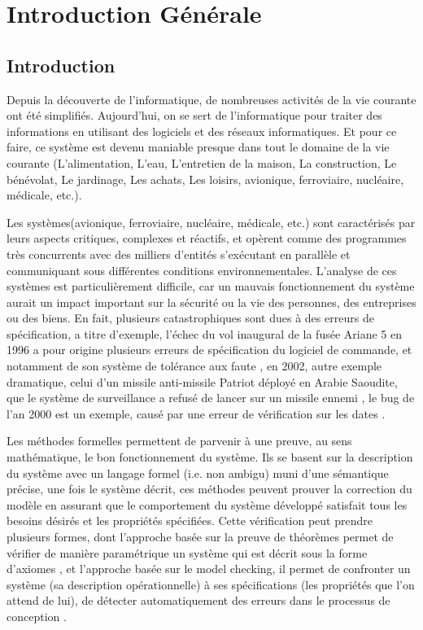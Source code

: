\chapter{Introduction Générale}
\section{Introduction}
Depuis la découverte de l’informatique, de nombreuses activités de la vie courante ont été simplifiés. Aujourd’hui, on se sert de l’informatique pour traiter des informations en utilisant des logiciels et des réseaux informatiques. Et pour ce faire, ce système est devenu maniable presque dans tout le domaine de la vie courante (L'alimentation, L'eau, L’entretien de la maison, La construction, Le bénévolat, Le jardinage, Les achats, Les loisirs, avionique, ferroviaire, nucléaire, médicale, etc.).

Les systèmes(avionique, ferroviaire, nucléaire, médicale, etc.) sont caractérisés par leurs aspects critiques, complexes et réactifs, et opèrent comme des programmes très concurrents avec des milliers d’entités s’exécutant en parallèle et communiquant sous différentes conditions environnementales. L’analyse de ces systèmes est particulièrement difficile, car un mauvais fonctionnement du système aurait un impact important sur la sécurité ou la vie des personnes, des entreprises ou des biens. En fait, plusieurs catastrophiques sont dues à des erreurs de spécification, a titre d'exemple, l'échec du vol inaugural de la fusée Ariane 5 en 1996 a pour origine  plusieurs erreurs de spécification du logiciel de commande, et notamment de son système de tolérance aux faute \cite{arian5}, en 2002, autre exemple dramatique, celui d’un missile anti-missile Patriot déployé en Arabie Saoudite, que le système de surveillance a refusé de lancer sur un missile ennemi \cite{patriot}, le bug de l'an 2000 est un exemple, causé par une erreur de vérification sur les dates \cite{bug2000}.

Les méthodes formelles permettent de parvenir à une preuve, au sens mathématique, le bon fonctionnement du système. Ils
se basent sur la description du système avec un langage formel (i.e. non ambigu) muni d’une sémantique précise, une fois le système décrit, ces méthodes peuvent prouver la correction du modèle en assurant que le comportement du système développé satisfait tous les besoins désirés et les propriétés spécifiées. Cette vérification peut prendre plusieurs formes, dont l’approche basée sur la preuve de théorèmes permet de vérifier de manière paramétrique un système qui est décrit sous la forme d’axiomes \cite{Rushby2001}, et l’approche basée sur le model checking, il permet de confronter un système (sa description opérationnelle) à ses spécifications (les propriétés que l’on attend de lui), de détecter automatiquement des erreurs dans le processus de conception \cite{Clark1999}.

